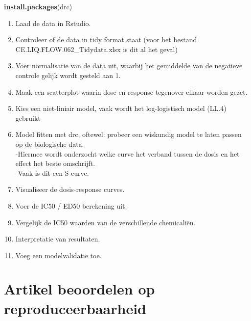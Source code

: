 \documentclass[
]{book}
\newenvironment{Shaded}{\begin{snugshade}}{\end{snugshade}}
\newcommand{\FunctionTok}[1]{\textcolor[rgb]{0.13,0.29,0.53}{\textbf{#1}}}
\newcommand{\NormalTok}[1]{#1}
\providecommand{\tightlist}{%
  \setlength{\itemsep}{0pt}\setlength{\parskip}{0pt}}
\begin{document}
\begin{Shaded}
\begin{Highlighting}[]
\FunctionTok{install.packages}\NormalTok{(drc)}
\end{Highlighting}
\end{Shaded}

\begin{enumerate}
\def\labelenumi{\arabic{enumi}.}
\setcounter{enumi}{1}
\tightlist
\item
  Laad de data in Rstudio.\\
\item
  Controleer of de data in tidy format staat (voor het bestand CE.LIQ.FLOW.062\_Tidydata.xlsx is dit al het geval)\\
\item
  Voer normalisatie van de data uit, waarbij het gemiddelde van de negatieve controle gelijk wordt gesteld aan 1.\\
\item
  Maak een scatterplot waarin dose en response tegenover elkaar worden gezet.\\
\item
  Kies een niet-liniair model, vaak wordt het log-logistisch model (LL.4) gebruikt\\
\item
  Model fitten met drc, oftewel: probeer een wiskundig model te laten passen op de biologische data.\\
  -Hiermee wordt onderzocht welke curve het verband tussen de dosis en het effect het beste omschrijft.\\
  -Vaak is dit een S-curve.\\
\item
  Visualiseer de dosis-response curves.\\
\item
  Voer de IC50 / ED50 berekening uit.\\
\item
  Vergelijk de IC50 waarden van de verschillende chemicaliën.\\
\item
  Interpretatie van resultaten.\\
\item
  Voeg een modelvalidatie toe.
\end{enumerate}

\chapter{Artikel beoordelen op reproduceerbaarheid}\label{artikel-beoordelen-op-reproduceerbaarheid}
\end{document}
